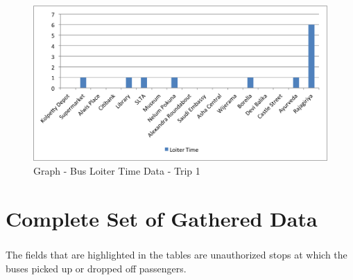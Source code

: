 \documentclass[12pt, oneside]{report}
\begin{document}
\begin{itemize}
\begin {figure} [h!]
\centering
\includegraphics[scale=1]{loiterTimeData-Trip1}
\caption [Graph - Bus Loiter Time Data - Trip 1] {Graph - Bus Loiter Time Data - Trip 1}
\label {image-loiterTimeData-Trip1}
\end {figure}

\end{itemize}

\appendix
\chapter{Complete Set of Gathered Data}
\label{appendix-CompleteSetOfData}

\paragraph{ } The fields that are highlighted in the tables are unauthorized stops at which the buses picked up or dropped off passengers.
\end{document}
